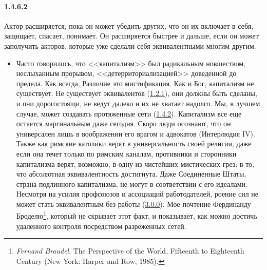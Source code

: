\paragraph{1.4.6.2}\hypertarget{par:1.4.6.2}{} Актор расширяется, пока он может убедить других, что он их включает в себя, защищает, спасает, понимает. Он расширяется быстрее и дальше, если он может заполучить акторов, которые уже сделали себя эквивалентными многим другим.
	\begin{itemize}
	\item Часто говорилось, что <<капитализм>> был радикальным новшеством, неслыханным прорывом, <<детерриториализацией>> доведенной до предела. Как всегда, Различие это мистификация. Как и Бог, капитализм не существует. Не существует эквивалентов (\hyperlink{par:1.2.1}{1.2.1}), они должны быть сделаны, и они дорогостоящи, не ведут далеко и их не хватает надолго. Мы, в лучшем случае, может создавать протяженные сети (\hyperlink{par:1.4.2}{1.4.2}). Капитализм все еще остается маргинальным даже сегодня. Скоро люди осознают, что он универсален лишь в воображении его врагом и адвокатов (Интерлюдия IV). Также как римские католики верят в универсальность своей религии, даже если она течет только по римским каналам, противники и сторонники капитализма верят, возможно, в одну из чистейших мистических грез: в то, что абсолютная эквивалентность достигнута. Даже Соединенные Штаты, страна подлинного капитализма, не могут в соответствии с его идеалами. Несмотря на усилия профсоюзов и ассоциаций работодателей, роение сил не может стать эквивалентным без работы (\hyperlink{par:3.0.0}{3.0.0}). Мое почтение Фердинанду Броделю\footnote{{\itshape Fernand Braudel}. The Perspective of the World, Fifteenth to Eighteenth Century (New York: Harper and Row, 1985).}, который не скрывает этот факт, и показывает, как можно достичь удаленного контроля посредством разреженных сетей.
	\end{itemize}

